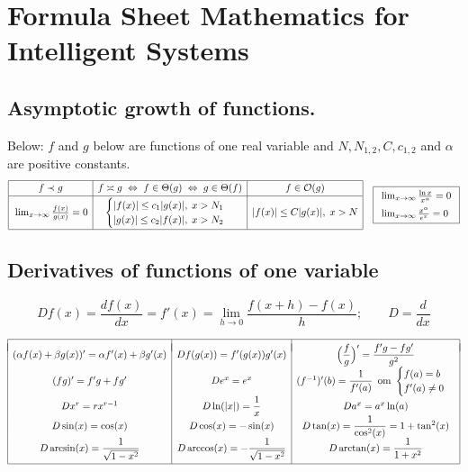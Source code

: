 \documentclass{article}
\newcommand{\Tr}[2]{#1}
\def\EndRow{\\*[3pt]}
\newcommand\Ordo{\mathcal O}
\let\iff\Leftrightarrow
\newcommand{\D}{D}
\begin{document}
\section*{
\Tr{Formula Sheet Mathematics for Intelligent Systems}
   {Formelblad Matematik för intelligenta system}
}

\subsection*{Asymptotic growth of functions. }%
Below: $f$ and $g$ below are functions of one real variable and
$N,N_{1,2},C,c_{1,2}$ and $\alpha$ are positive constants.
\[
  \begin{array}[m]{|*{3}{c|}}
    \hline
    \rule[-5pt]{0pt}{15pt}
      f \prec g
    & f \asymp g \;\iff\; f\in\Theta(g)\;\iff\; g\in\Theta(f)
    & f \in \Ordo(g)
    \\ \hline
    \rule[-14pt]{0pt}{33pt}
      \lim_{x\to\infty} \frac{f(x)}{g(x)} = 0
    &
    \begin{cases}
      |f(x)| \le c_1 |g(x)|,\; x>N_1 \\
      |g(x)| \le c_2 |f(x)|,\; x>N_2 \\
    \end{cases}
    &
    |f(x)| \le C |g(x)|,\;x>N \\
  \hline
  \end{array}
  \hspace{1em}
  \boxed{
    \begin{array}[m]{l}
      \lim_{x\to\infty} \frac{\ln x}{x^\alpha}=0\\[5pt]
      \lim_{x\to\infty}  \frac{x^\alpha}{e^x}=0\\
    \end{array}
  }
\]%

\subsection*{\Tr{Derivatives of functions of one variable} {Derivator}}%

$$Df(x)=\frac{df(x)}{dx}=f'(x)
=\lim_{h\rightarrow 0}\frac{f(x+h)-f(x)}{h};
\qquad D=\frac d{dx}
$$

$\begin{array}{|c|c|c|}\hline & &\\*[-8pt]
(\alpha f(x)+\beta g(x))'=\alpha f'(x)+\beta g'(x)&
\D f(g(x))=f'(g(x))g'(x)
&\Bigl(\dfrac{f}{g}\Bigr)'
 =\dfrac{f'g-fg'}{g^2}
\EndRow
(fg)'=f'g+fg' & \D e^x = e^x &
(f^{-1})'(b) = \dfrac1{f'(a)}\,\mbox{ om }
\begin{cases}
f(a)=b\\f'(a)\neq0    %
\end{cases}
\EndRow
\D x^r=rx^{r-1}
&   \D\ln(|x|)=\dfrac{1}{x} &\D a^x=a^x\ln(a)
\EndRow
 \D\sin(x)=\cos(x) & \D\cos(x)=-\sin(x) &
  \D\tan(x)=\dfrac{1}{\cos^2(x)}=1+\tan^2(x)
\EndRow
\D\arcsin(x)=\dfrac{1}{\sqrt{1-x^2}} &
\D\arccos(x)=-\dfrac{1}{\sqrt{1-x^2}} &
\D\arctan(x)=\dfrac{1}{1+x^2}
\\*[9pt]
\hline
\end{array}$
\end{document}
